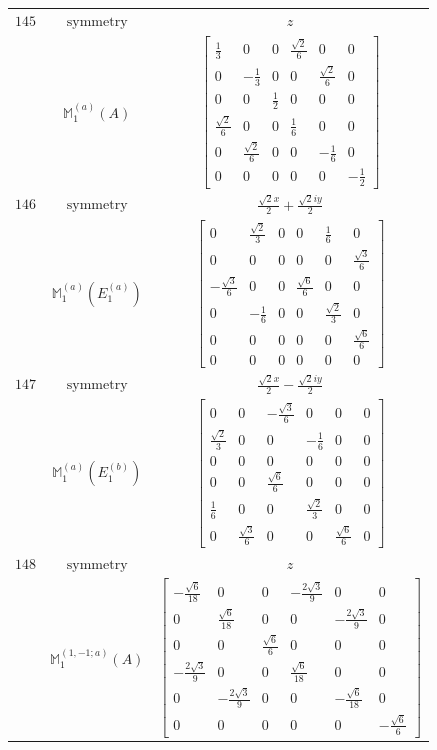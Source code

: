 \documentclass[fleqn,8pt,landscape]{jsarticle}
\begin{document}
\begin{longtable}{ccc}
$ 145 $ & $ \text{symmetry} $ & $ z $ \\
$  $ & $ \mathbb{M}_{1}^{(a)}(A) $ & $ \begin{bmatrix} \frac{1}{3} & 0 & 0 & \frac{\sqrt{2}}{6} & 0 & 0 \\ 0 & - \frac{1}{3} & 0 & 0 & \frac{\sqrt{2}}{6} & 0 \\ 0 & 0 & \frac{1}{2} & 0 & 0 & 0 \\ \frac{\sqrt{2}}{6} & 0 & 0 & \frac{1}{6} & 0 & 0 \\ 0 & \frac{\sqrt{2}}{6} & 0 & 0 & - \frac{1}{6} & 0 \\ 0 & 0 & 0 & 0 & 0 & - \frac{1}{2} \end{bmatrix} $ \\ \hline
$ 146 $ & $ \text{symmetry} $ & $ \frac{\sqrt{2} x}{2} + \frac{\sqrt{2} i y}{2} $ \\
$  $ & $ \mathbb{M}_{1}^{(a)}(E_{1}^{(a)}) $ & $ \begin{bmatrix} 0 & \frac{\sqrt{2}}{3} & 0 & 0 & \frac{1}{6} & 0 \\ 0 & 0 & 0 & 0 & 0 & \frac{\sqrt{3}}{6} \\ - \frac{\sqrt{3}}{6} & 0 & 0 & \frac{\sqrt{6}}{6} & 0 & 0 \\ 0 & - \frac{1}{6} & 0 & 0 & \frac{\sqrt{2}}{3} & 0 \\ 0 & 0 & 0 & 0 & 0 & \frac{\sqrt{6}}{6} \\ 0 & 0 & 0 & 0 & 0 & 0 \end{bmatrix} $ \\ \hline
$ 147 $ & $ \text{symmetry} $ & $ \frac{\sqrt{2} x}{2} - \frac{\sqrt{2} i y}{2} $ \\
$  $ & $ \mathbb{M}_{1}^{(a)}(E_{1}^{(b)}) $ & $ \begin{bmatrix} 0 & 0 & - \frac{\sqrt{3}}{6} & 0 & 0 & 0 \\ \frac{\sqrt{2}}{3} & 0 & 0 & - \frac{1}{6} & 0 & 0 \\ 0 & 0 & 0 & 0 & 0 & 0 \\ 0 & 0 & \frac{\sqrt{6}}{6} & 0 & 0 & 0 \\ \frac{1}{6} & 0 & 0 & \frac{\sqrt{2}}{3} & 0 & 0 \\ 0 & \frac{\sqrt{3}}{6} & 0 & 0 & \frac{\sqrt{6}}{6} & 0 \end{bmatrix} $ \\ \hline
$ 148 $ & $ \text{symmetry} $ & $ z $ \\
$  $ & $ \mathbb{M}_{1}^{(1,-1;a)}(A) $ & $ \begin{bmatrix} - \frac{\sqrt{6}}{18} & 0 & 0 & - \frac{2 \sqrt{3}}{9} & 0 & 0 \\ 0 & \frac{\sqrt{6}}{18} & 0 & 0 & - \frac{2 \sqrt{3}}{9} & 0 \\ 0 & 0 & \frac{\sqrt{6}}{6} & 0 & 0 & 0 \\ - \frac{2 \sqrt{3}}{9} & 0 & 0 & \frac{\sqrt{6}}{18} & 0 & 0 \\ 0 & - \frac{2 \sqrt{3}}{9} & 0 & 0 & - \frac{\sqrt{6}}{18} & 0 \\ 0 & 0 & 0 & 0 & 0 & - \frac{\sqrt{6}}{6} \end{bmatrix} $ \\ \hline

\end{longtable}
\end{document}
